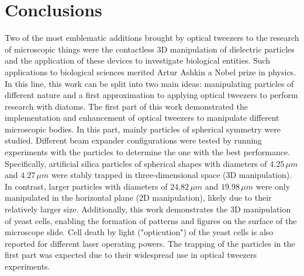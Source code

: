 \documentclass[letterpaper,12pt,oneside]{book}
\begin{document}
\chapter{Conclusions}  
Two of the most emblematic additions brought by optical tweezers to the research of microscopic things were the contactless 3D manipulation of dielectric particles and the application of these devices to investigate biological entities. Such applications to biological sciences merited Artur Ashkin a Nobel prize in physics. \newline 
In this line, this work can be split into two main ideas: manipulating particles of different nature and a first approximation to applying optical tweezers to perform research with diatoms.
The first part of this work demonstrated the implementation and enhancement of optical tweezers to manipulate different microscopic bodies. In this part, mainly particles of spherical symmetry were studied. Different beam expander configurations were tested by running experiments with the particles to determine the one with the best performance. Specifically, artificial silica particles of spherical shapes with diameters of \(4.25 \, \mu m\) and \(4.27 \, \mu m\) were stably trapped in three-dimensional space (3D manipulation). In contrast, larger particles with diameters of \(24.82 \, \mu m\) and \(19.98 \, \mu m\) were only manipulated in the horizontal plane (2D manipulation), likely due to their relatively larger size. Additionally, this work demonstrates the 3D manipulation of yeast cells, enabling the formation of patterns and figures on the surface of the microscope slide. Cell death by light ("opticution") of the yeast cells is also reported for different laser operating powers.
The trapping of the particles in the first part was expected due to their widespread use in optical tweezers experiments. %
\end{document}
